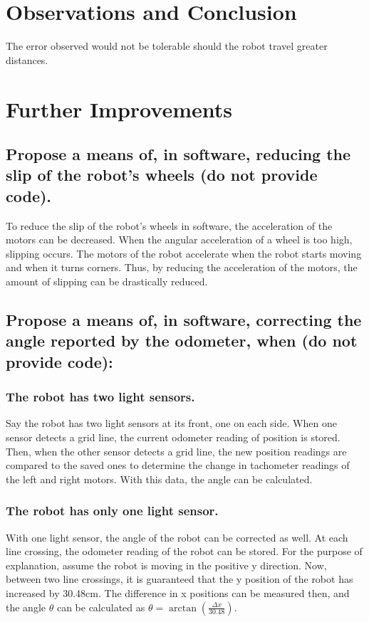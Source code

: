 \documentclass[11pt]{article} %
\begin{document}
\section{Observations and Conclusion}
The error observed would not be tolerable should the robot travel greater distances.
\section{Further Improvements}
\subsection{Propose a means of, in software, reducing the slip of the robot's wheels (do not provide code).}
To reduce the slip of the robot's wheels in software, the acceleration of the motors can be
decreased. When the angular acceleration of a wheel is too high, slipping occurs. The motors of the
robot accelerate when the robot starts moving and when it turns corners. Thus, by reducing
the acceleration of the motors, the amount of slipping can be drastically reduced.
\subsection{Propose a means of, in software, correcting the angle reported by the odometer, when (do not provide code):}
\subsubsection{The robot has two light sensors.}
Say the robot has two light sensors at its front, one on each side. When one sensor detects a grid
line, the current odometer reading of position is stored. Then, when the other sensor
detects a grid line, the new position readings are compared to the saved ones to determine the
change in tachometer readings of the left and right motors. With this data, the angle can be
calculated.
\subsubsection{The robot has only one light sensor.}
With one light sensor, the angle of the robot can be corrected as well. At each line crossing, the
odometer reading of the robot can be stored. For the purpose of explanation, assume the robot is
moving in the positive y direction. Now, between two line crossings, it is guaranteed that the y
position of the robot has increased by 30.48cm. The difference in x positions can be measured then,
and the angle $\theta$ can be calculated as $\theta = \arctan{(\frac{\Delta x}{30.48})}$.
\end{document}

